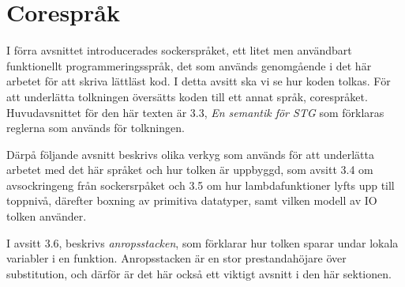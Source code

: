 \documentclass[Rapport]{subfiles}
\begin{document}
\section{Corespråk}


I förra avsnittet introducerades sockerspråket, ett litet men användbart
funktionellt programmeringsspråk, det som används genomgående i det här
arbetet för att skriva lättläst kod.
    I detta avsitt ska vi se hur koden tolkas. För att underlätta
tolkningen översätts koden till ett annat språk, corespråket. 
Huvudavsnittet för den här texten är 3.3, \emph{En semantik för STG}
som förklaras reglerna som används för
tolkningen. 

Därpå följande avsnitt beskrivs olika verkyg som används för att
underlätta arbetet med det här språket och hur tolken är uppbyggd,
som avsitt 3.4 om avsockringeng från sockersrpåket och 3.5 
om hur lambdafunktioner lyfts upp till toppnivå, därefter
boxning av primitiva datatyper, samt vilken modell av IO tolken använder.

I avsitt 3.6, beskrivs \emph{anropsstacken}, som förklarar hur tolken
sparar undar lokala variabler i en funktion. Anropsstacken är en 
stor prestandahöjare över substitution, och därför är det här också ett
viktigt avsnitt i den här sektionen.












\end{document}
